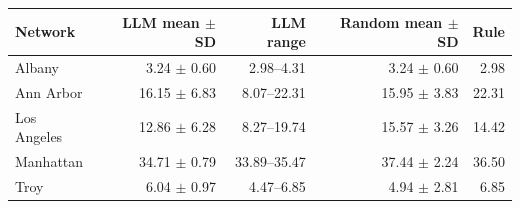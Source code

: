 \begin{tabular}{lrrrr}
\toprule
Network & LLM mean $\pm$ SD & LLM range & Random mean $\pm$ SD & Rule \\
\midrule
Albany & 3.24 $\pm$ 0.60 & 2.98--4.31 & 3.24 $\pm$ 0.60 & 2.98 \\
Ann Arbor & 16.15 $\pm$ 6.83 & 8.07--22.31 & 15.95 $\pm$ 3.83 & 22.31 \\
Los Angeles & 12.86 $\pm$ 6.28 & 8.27--19.74 & 15.57 $\pm$ 3.26 & 14.42 \\
Manhattan & 34.71 $\pm$ 0.79 & 33.89--35.47 & 37.44 $\pm$ 2.24 & 36.50 \\
Troy & 6.04 $\pm$ 0.97 & 4.47--6.85 & 4.94 $\pm$ 2.81 & 6.85 \\
\bottomrule
\end{tabular}
